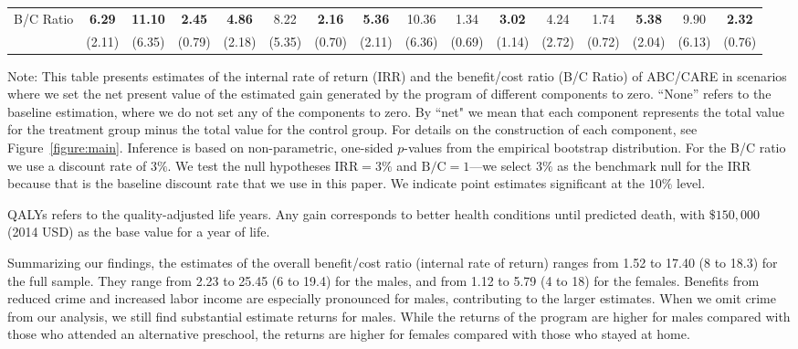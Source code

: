 \begin{table}
\begin{threeparttable}
\begin{tabular}{lccc|ccc|ccc|ccc|ccc}
B/C Ratio & \textbf{6.29} & \textbf{11.10} & \textbf{2.45} & 	\textbf{4.86} & 8.22  & \textbf{2.16} & \textbf{5.36} & 10.36 &  1.34 &  	\textbf{3.02} & 4.24 & 1.74  & 		\textbf{5.38} & 9.90 & \textbf{2.32} \\
                 & (2.11) & (6.35) & (0.79) & 				(2.18) & (5.35) & (0.70) & 			(2.11) &  (6.36) &  (0.69) & 			(1.14) & (2.72) & (0.72)   & 	(2.04) & (6.13) & (0.76)  \\ \bottomrule
\end{tabular}
\begin{tablenotes}
\footnotesize
\item Note: This table presents estimates of the internal rate of return (IRR) and the benefit/cost ratio (B/C Ratio) of ABC/CARE in scenarios where we set the net present value of the estimated gain generated by the program of different components to zero. ``None'' refers to the baseline estimation, where we do not set any of the components to zero. By ``net" we mean that each component represents the total value for the treatment group minus the total value for the control group. For details on the construction of each component, see Figure~\ref{figure:main}. Inference is based on non-parametric, one-sided $p$-values from the empirical bootstrap distribution. For the B/C ratio we use a discount rate of $3\%$. We test the null hypotheses $\text{IRR} = 3\%$ and $\text{B/C} = 1$---we select $3\%$ as the benchmark null for the IRR because that is the baseline discount rate that we use in this paper. We indicate point estimates significant at the $10\%$ level. \\
\item *QALYs refers to the quality-adjusted life years. Any gain corresponds to better health conditions until predicted death, with $\$150,000$ (2014 USD) as the base value for a year of life.\\
\end{tablenotes}
\end{threeparttable}
\end{table}

Summarizing our findings, the estimates of the overall benefit/cost ratio (internal rate of return) ranges from 1.52 to 17.40 (8 to 18.3) for the full sample. They range from 2.23 to 25.45 (6 to 19.4) for the males, and from 1.12 to 5.79 (4 to 18) for the females. Benefits from reduced crime and increased labor income are especially pronounced for males, contributing to the larger estimates. When we omit crime from our analysis, we still find substantial estimate returns for males. While the returns of the program are higher for males compared with those who attended an alternative preschool, the returns are higher for females compared with those who stayed at home.

